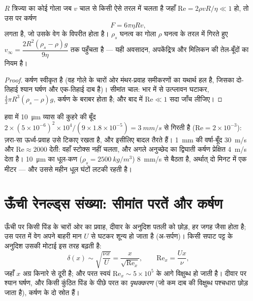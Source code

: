 \begin{proposition}[स्टोक्स कर्षण]\label{prop:b2:viscous-flows:stokes}
$R$ त्रिज्या का कोई गोला जब $v$ चाल से किसी ऐसे तरल में चलता है जहाँ
$\mathrm{Re} = 2\rho vR/\eta \ll 1$ हो, तो उस पर कर्षण
\[
F = 6\pi\eta Rv ,
\]
लगता है, जो उसके वेग के विपरीत होता है। $\rho_s$ घनत्व का गोला
$\rho$ घनत्व के तरल में गिरते हुए \emph{} $v_\infty =
\dfrac{2R^2(\rho_s - \rho)g}{9\eta}$ तक पहुँचता है --- यही अवसादन,
अपकेंद्रित्र और मिलिकन की तेल-बूँदों का नियम है।
\end{proposition}

\begin{proof}
कर्षण स्वीकृत है (वह गोले के चारों ओर मंथर-प्रवाह समीकरणों का यथार्थ हल
है, जिसका दो-तिहाई श्यान घर्षण और एक-तिहाई
दाब है)। सीमांत चाल: भार में से उत्प्लावन घटाकर, $\tfrac43\pi R^3(\rho_s -
\rho)g$, कर्षण के बराबर होता है; और बाद में $\mathrm{Re} \ll 1$ सदा जाँच लीजिए।
\end{proof}

\begin{example}[कुहरा, वर्षा और धूल]\label{ex:b2:viscous-flows:fog}
हवा में \qty{10}{\micro m} व्यास की कुहरे की बूँद $2 \times (5 \times
10^{-6})^2 \times 10^4/(9 \times 1.8 \times 10^{-5}) = \qty{3}{mm/s}$ से गिरती है ($\mathrm{Re} = 2 \times
10^{-3}$): ज़रा-सा ऊर्ध्व-प्रवाह उसे टिकाए रखता है, और इसीलिए बादल
तैरते हैं। \qty{1}{mm} की वर्षा-बूँद \qty{30}{m/s} और $\mathrm{Re} \approx 2000$ देती:
वहाँ स्टोक्स नहीं चलता, और अगले अनुच्छेद का द्विघाती कर्षण
प्रेक्षित \qty{4}{m/s} देता है। \qty{10}{\micro m} का धूल-कण ($\rho_s =
\qty{2500}{kg/m^3}$) \qty{8}{mm/s} से बैठता है, अर्थात् दो मिनट में एक मीटर ---
और उससे महीन धूल घंटों लटकी रहती है।
\end{example}

\section{ऊँची रेनल्ड्स संख्या: सीमांत परतें और कर्षण}

\begin{proposition}[सीमांत परत]\label{prop:b2:viscous-flows:bl}
ऊँची  पर किसी पिंड के चारों ओर का प्रवाह, दीवार के
अनुदिश पतली \emph{} को छोड़, हर जगह  जैसा होता है;
उस परत में वेग अपने बाहरी मान $U$ से घटकर शून्य हो जाता है (अ-सर्पण)।
किसी सपाट पट्ट के अनुदिश उसकी मोटाई इस तरह बढ़ती है:
\[
\delta(x) \sim \sqrt{\frac{\nu x}{U}} = \frac{x}{\sqrt{\mathrm{Re}_x}} ,
\qquad \mathrm{Re}_x = \frac{Ux}{\nu} ,
\]
जहाँ $x$ अग्र किनारे से दूरी है; और परत स्वयं
$\mathrm{Re}_x \sim 5 \times 10^5$ के आगे विक्षुब्ध हो जाती है। दीवार पर श्यान घर्षण,
और किसी कुंठित पिंड के पीछे परत का \emph{पृथक्करण} (जो कम दाब की
विक्षुब्ध पश्चधारा छोड़ जाता है), कर्षण के दो स्रोत हैं।
\end{proposition}


